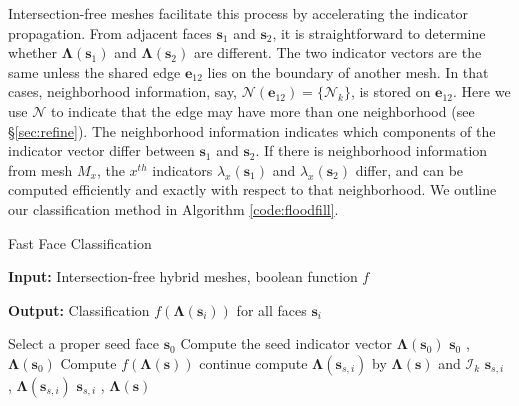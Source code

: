 Intersection-free meshes facilitate this process by accelerating the indicator propagation. From adjacent faces $\bm{s}_1$ and $\bm{s}_2$, it is straightforward to determine whether $\bm{\Lambda}(\bm{s}_1)$ and $\bm{\Lambda}(\bm{s}_2)$ are different. The two indicator vectors are the same unless the shared edge $\bm{e}_{12}$ lies on the boundary of another mesh. In that cases, neighborhood information, say, $\bm{\mathcal{N}}(\bm{e}_{12}) = \{\mathcal{N}_k\}$, is stored on $\bm{e}_{12}$. Here we use $\bm{\mathcal{N}}$ to indicate that the edge may have more than one neighborhood (see \S\ref{sec:refine}). The neighborhood information indicates which components of the indicator vector differ between $\bm{s}_1$ and $\bm{s}_2$. If there is neighborhood information from mesh $M_x$, the $x^{th}$ indicators $\lambda_x(\bm{s}_1)$ and $\lambda_x(\bm{s}_2)$ differ, and can be computed efficiently and exactly with respect to that neighborhood. We outline our classification method in Algorithm \ref{code:floodfill}.


\begin{algorithm}
\caption{Fast Face Classification}
\label{code:floodfill}
\textbf{Input: } Intersection-free hybrid meshes, boolean function $f$

\textbf{Output: } Classification $f(\bm{\Lambda}(\bm{s}_i))$ for all faces $\bm{s}_i$


\begin{algorithmic}[1]
\State Select a proper seed face $\bm{s}_0$
\State Compute the seed indicator vector $\boldsymbol{\Lambda}(\bm{s}_0)$
\State {} { $\bm{s}_0$ , $\boldsymbol{\Lambda}(\bm{s}_0)$}
\State
{}
    \State Compute $f(\boldsymbol{\Lambda}(\bm{s}))$
            \State continue
        \EndIf
            \State compute $\boldsymbol{\Lambda}(\bm{s}_{s, i})$ by $\boldsymbol{\Lambda}(\bm{s})$ and ${\bm{\mathcal{I}}}_k$
            \State {} { $\bm{s}_{s, i}$ , $\boldsymbol{\Lambda}(\bm{s}_{s, i})$}
        \Else
            \State {} { $\bm{s}_{s, i}$ , $\boldsymbol{\Lambda}(\bm{s})$}
        \EndIf
    \EndFor
\EndFunction
\end{algorithmic}
\end{algorithm}


